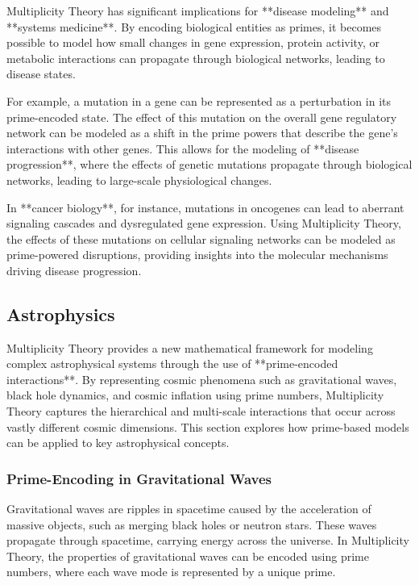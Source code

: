 \documentclass[12pt]{article}
\begin{document}
Multiplicity Theory has significant implications for **disease modeling** and **systems medicine**. By encoding biological entities as primes, it becomes possible to model how small changes in gene expression, protein activity, or metabolic interactions can propagate through biological networks, leading to disease states.

For example, a mutation in a gene can be represented as a perturbation in its prime-encoded state. The effect of this mutation on the overall gene regulatory network can be modeled as a shift in the prime powers that describe the gene’s interactions with other genes. This allows for the modeling of **disease progression**, where the effects of genetic mutations propagate through biological networks, leading to large-scale physiological changes.

In **cancer biology**, for instance, mutations in oncogenes can lead to aberrant signaling cascades and dysregulated gene expression. Using Multiplicity Theory, the effects of these mutations on cellular signaling networks can be modeled as prime-powered disruptions, providing insights into the molecular mechanisms driving disease progression.


\subsection{Astrophysics}

Multiplicity Theory provides a new mathematical framework for modeling complex astrophysical systems through the use of **prime-encoded interactions**. By representing cosmic phenomena such as gravitational waves, black hole dynamics, and cosmic inflation using prime numbers, Multiplicity Theory captures the hierarchical and multi-scale interactions that occur across vastly different cosmic dimensions. This section explores how prime-based models can be applied to key astrophysical concepts.

\subsubsection{Prime-Encoding in Gravitational Waves}

Gravitational waves are ripples in spacetime caused by the acceleration of massive objects, such as merging black holes or neutron stars. These waves propagate through spacetime, carrying energy across the universe. In Multiplicity Theory, the properties of gravitational waves can be encoded using prime numbers, where each wave mode is represented by a unique prime.
\end{document}
